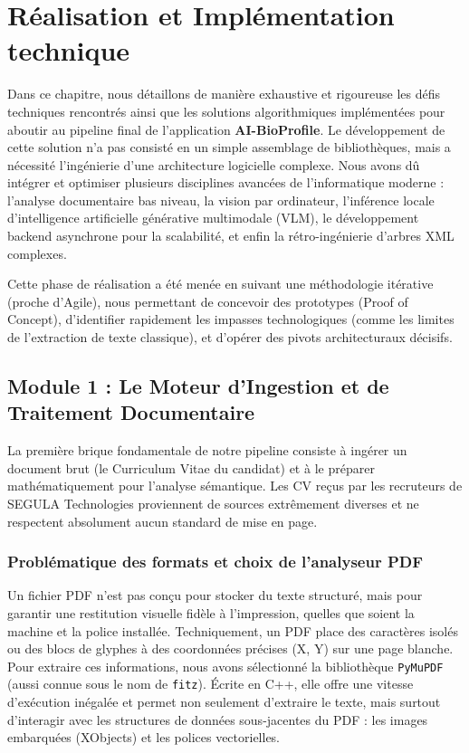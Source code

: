 \chapter{Réalisation et Implémentation technique}

Dans ce chapitre, nous détaillons de manière exhaustive et rigoureuse les défis techniques rencontrés ainsi que les solutions algorithmiques implémentées pour aboutir au pipeline final de l'application \textbf{AI-BioProfile}. Le développement de cette solution n'a pas consisté en un simple assemblage de bibliothèques, mais a nécessité l'ingénierie d'une architecture logicielle complexe. Nous avons dû intégrer et optimiser plusieurs disciplines avancées de l'informatique moderne : l'analyse documentaire bas niveau, la vision par ordinateur, l'inférence locale d'intelligence artificielle générative multimodale (VLM), le développement backend asynchrone pour la scalabilité, et enfin la rétro-ingénierie d'arbres XML complexes.

Cette phase de réalisation a été menée en suivant une méthodologie itérative (proche d'Agile), nous permettant de concevoir des prototypes (Proof of Concept), d'identifier rapidement les impasses technologiques (comme les limites de l'extraction de texte classique), et d'opérer des pivots architecturaux décisifs.

\section{Module 1 : Le Moteur d'Ingestion et de Traitement Documentaire}

La première brique fondamentale de notre pipeline consiste à ingérer un document brut (le Curriculum Vitae du candidat) et à le préparer mathématiquement pour l'analyse sémantique. Les CV reçus par les recruteurs de SEGULA Technologies proviennent de sources extrêmement diverses et ne respectent absolument aucun standard de mise en page. 

\subsection{Problématique des formats et choix de l'analyseur PDF}
Un fichier PDF n'est pas conçu pour stocker du texte structuré, mais pour garantir une restitution visuelle fidèle à l'impression, quelles que soient la machine et la police installée. Techniquement, un PDF place des caractères isolés ou des blocs de glyphes à des coordonnées précises (X, Y) sur une page blanche. 
Pour extraire ces informations, nous avons sélectionné la bibliothèque \texttt{PyMuPDF} (aussi connue sous le nom de \texttt{fitz}). Écrite en C++, elle offre une vitesse d'exécution inégalée et permet non seulement d'extraire le texte, mais surtout d'interagir avec les structures de données sous-jacentes du PDF : les images embarquées (XObjects) et les polices vectorielles.

